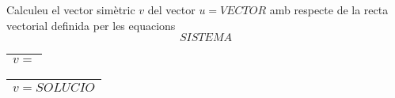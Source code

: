 \begin{enunciat}
  Calculeu el vector sim\`etric $v$ del vector $u = VECTOR$ amb respecte de
  la recta vectorial definida per les equacions
\[
  SISTEMA
\]
\end{enunciat}

\begin{quadricula}
\begin{tabular}{|L{5cm}{1.25cm}|}
\hline
$v=$ \\
\hline
\end{tabular}
\end{quadricula}

\begin{solucio}
\begin{center}
\begin{tabular}{|C{5cm}{1.25cm}|}
\hline
$v=SOLUCIO$ \\
\hline
\end{tabular}
\end{center}
\end{solucio}
